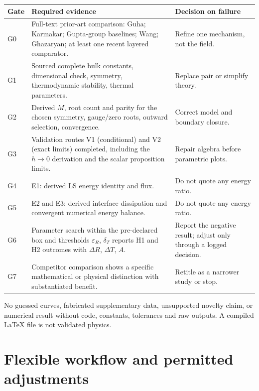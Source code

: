 \documentclass[11pt]{article}
\begin{document}
\begin{center}
\begin{tabular}{@{}p{}p{}p{}@{}}
\toprule
\textbf{Gate} & \textbf{Required evidence} & \textbf{Decision on failure} \\
\midrule
G0 & Full-text prior-art comparison: Guha; Karmakar; Gupta-group baselines;
  Wang; Ghazaryan; at least one recent layered comparator. & Refine one
  mechanism, not the field. \\
G1 & Sourced complete bulk constants, dimensional check, symmetry,
  thermodynamic stability, thermal parameters. & Replace pair or simplify
  theory. \\
G2 & Derived $M$, root count and parity for the chosen symmetry, gauge/zero
  roots, outward selection, convergence. & Correct model and boundary closure. \\
G3 & Validation routes V1 (conditional) and V2 (exact limits) completed,
  including the $h\to0$ derivation and the scalar proposition limits. & Repair
  algebra before parametric plots. \\
G4 & E1: derived LS energy identity and flux. & Do not quote any energy ratio. \\
G5 & E2 and E3: derived interface dissipation and convergent numerical energy
  balance. & Do not quote any energy ratio. \\
G6 & Parameter search within the pre-declared box and thresholds
  $\varepsilon_R$, $\delta_T$ reports H1 and H2 outcomes with $\Delta R$,
  $\Delta T$, $A$. & Report the negative result; adjust only through a logged
  decision. \\
G7 & Competitor comparison shows a specific mathematical or physical distinction
  with substantiated benefit. & Retitle as a narrower study or stop. \\
\bottomrule
\end{tabular}
\end{center}

No guessed curves, fabricated supplementary data, unsupported novelty claim, or
numerical result without code, constants, tolerances and raw outputs. A compiled
LaTeX file is not validated physics.

\section{Flexible workflow and permitted adjustments}
\end{document}
